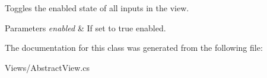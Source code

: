 Toggles the enabled state of all inputs in the view. 


\begin{DoxyParams}{Parameters}
{\em enabled} & If set to {\ttfamily true} enabled.\\
\hline
\end{DoxyParams}


The documentation for this class was generated from the following file\+:\begin{DoxyCompactItemize}
\item 
Views/Abstract\+View.\+cs\end{DoxyCompactItemize}
